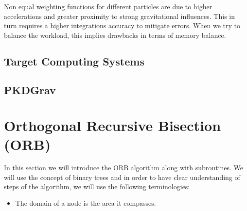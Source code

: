 \documentclass[]{article}
\begin{document}
Non equal weighting functions for different particles are due to higher accelerations and greater proximity to strong gravitational influences. This in turn requires a higher integrations accuracy to mitigate errors. When we try to balance the workload, this implies drawbacks in terms of memory balance. 



\subsection{Target Computing Systems}\label{section:target-systems}


\subsection{PKDGrav}


\newpage
\section{Orthogonal Recursive Bisection (ORB)}


In this section we will introduce the ORB algorithm along with subroutines. We will use the concept of binary trees and in order to have clear understanding of steps of the algorithm, we will use the following terminologies: 

\begin{itemize}
	\begin{comment}
		\item The left child of a node with index $i$ has the index $2\times i$. 
	\item The right child of a node with index $i$ has the index $i*2 + 1$. 
	\item The parent of a node with index $i$ has the index $\lfloor \frac{i}{2} \rfloor$. 
	\item The root node has the index $i$.
	\end{comment}

	\item The domain of a node is the area it compasses. 
\end{itemize}
\end{document}
